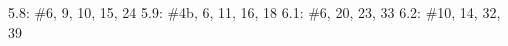 \documentclass[name=Ojas\ Chaturvedi, emailid=oj.chaturvedi.2024, course=Capstone:\ Discrete\ Math, num=10, deadline={December\ 14,\ 2023}]{homework}
\begin{document}
5.8: \#6, 9, 10, 15, 24
5.9: \#4b, 6, 11, 16, 18
6.1: \#6, 20, 23, 33
6.2: \#10, 14, 32, 39
\end{document}
